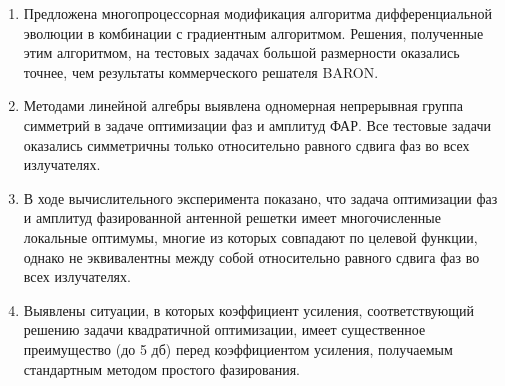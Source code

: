 \begin{enumerate}
\item Предложена многопроцессорная модификация алгоритма дифференциальной эволюции в комбинации с градиентным алгоритмом. Решения, полученные этим алгоритмом, на тестовых задачах большой размерности оказались точнее, чем результаты коммерческого решателя BARON.   
  \item Методами линейной алгебры выявлена одномерная непрерывная группа симметрий в задаче оптимизации фаз и амплитуд ФАР. Все тестовые задачи оказались симметричны только относительно равного сдвига фаз во всех излучателях.
  \item В ходе вычислительного эксперимента показано, что задача оптимизации фаз и амплитуд фазированной антенной решетки имеет многочисленные локальные оптимумы, многие из которых совпадают по целевой функции, однако не эквивалентны между собой относительно равного сдвига фаз во всех излучателях.
  \item Выявлены ситуации, в которых коэффициент усиления, соответствующий решению задачи квадратичной оптимизации, имеет существенное преимущество (до 5 дб) перед коэффициентом усиления, получаемым стандартным методом простого фазирования. 
\end{enumerate}
